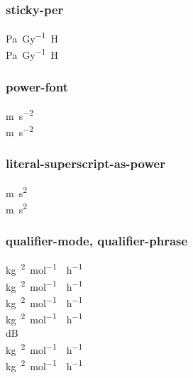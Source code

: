 \documentclass{article}
\begin{document}
\subsubsection{sticky-per}
\si{\pascal\per\gray\henry} \\
\si[sticky-per]{\pascal\per\gray\henry}\\

\subsubsection{power-font}
\si{\metre\per\second\squared} \\
\si[power-font = unit]{\metre\per\second\squared}\\

\subsubsection{literal-superscript-as-power}
\si{m.s^{2}} \\
\si[literal-superscript-as-power = false]{m.s^{2}}\\

\subsubsection{qualifier-mode, qualifier-phrase}
\si{\kilogram\polymer\squared\per\mole\catalyst\per\hour} \\
\si[qualifier-mode = brackets]
{\kilogram\polymer\squared\per\mole\catalyst\per\hour} \\
\si[qualifier-mode = subscript]
{\kilogram\polymer\squared\per\mole\catalyst\per\hour} \\
\si[qualifier-mode = space]
{\kilogram\polymer\squared\per\mole\catalyst\per\hour} \\
\si[qualifier-mode = text]
{\deci\bel\isotropic}\\

\si[qualifier-mode = phrase]
{\kilogram\polymer\squared\per\mole\catalyst\per\hour} \\
\si[qualifier-mode = phrase, qualifier-phrase = { by }]
{\kilogram\polymer\squared\per\mole\catalyst\per\hour} \\
\end{document}
